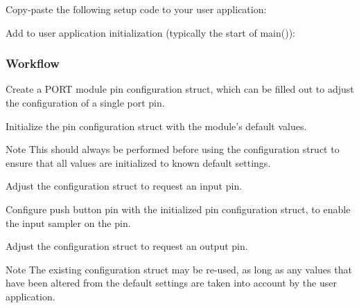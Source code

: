 Copy-\/paste the following setup code to your user application\+: 
\begin{DoxyCodeInclude}
\end{DoxyCodeInclude}
 Add to user application initialization (typically the start of {\ttfamily main()})\+: 
\begin{DoxyCodeInclude}
\end{DoxyCodeInclude}
 \hypertarget{asfdoc_sam0_port_basic_use_case_asfdoc_sam0_port_basic_use_case_setup_flow}{}\subsubsection{Workflow}\label{asfdoc_sam0_port_basic_use_case_asfdoc_sam0_port_basic_use_case_setup_flow}

\begin{DoxyEnumerate}
\item Create a P\+O\+R\+T module pin configuration struct, which can be filled out to adjust the configuration of a single port pin. 
\begin{DoxyCodeInclude}
\end{DoxyCodeInclude}

\item Initialize the pin configuration struct with the module's default values. 
\begin{DoxyCodeInclude}
\end{DoxyCodeInclude}
 \begin{DoxyNote}{Note}
This should always be performed before using the configuration struct to ensure that all values are initialized to known default settings.
\end{DoxyNote}

\item Adjust the configuration struct to request an input pin. 
\begin{DoxyCodeInclude}
\end{DoxyCodeInclude}

\item Configure push button pin with the initialized pin configuration struct, to enable the input sampler on the pin. 
\begin{DoxyCodeInclude}
\end{DoxyCodeInclude}

\item Adjust the configuration struct to request an output pin. 
\begin{DoxyCodeInclude}
\end{DoxyCodeInclude}
 \begin{DoxyNote}{Note}
The existing configuration struct may be re-\/used, as long as any values that have been altered from the default settings are taken into account by the user application.
\end{DoxyNote}


\end{DoxyEnumerate}
